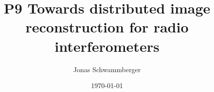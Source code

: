 \documentclass[11pt]{article}
\numberwithin{equation}{section}
\begin{document}
\title{P9 Towards distributed image reconstruction for radio interferometers}
\author{Jonas Schwammberger}
\date{\today}
\begin{titlepage}
	\maketitle
	
	\thispagestyle{empty}
	\setcounter{page}{0}
\end{titlepage}


\newpage
\pagestyle{abstract}


\newpage
\pagestyle{tableofcontent}
\tableofcontents  	
\newpage

\pagestyle{documentstyle}
\setcounter{page}{1}


\newpage

\newpage

\newpage

\newpage
%

\newpage

\newpage

\newpage

\newpage

\newpage

\newpage


\newpage
{}
%

\newpage
\listoffigures
\listoftables

\newpage

\newpage

\end{document}
